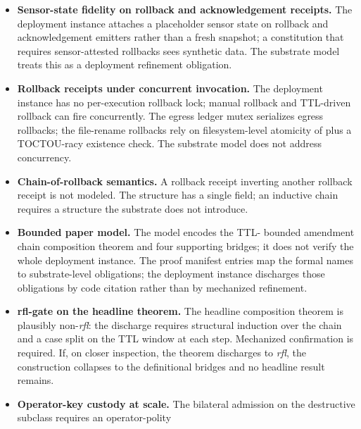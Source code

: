 \begin{itemize}
    path, the tool-preflight admission hook, and the package-manager
    runtime guard. The substrate model treats sensor state as an
    audited input; the deployment instance's input fidelity on the
    Endpoint Security path is below the substrate model's assumption.
  \item \textbf{Sensor-state fidelity on rollback and acknowledgement
    receipts.} The deployment instance attaches a placeholder sensor
    state on rollback and acknowledgement emitters rather than a
    fresh snapshot; a constitution that requires sensor-attested
    rollbacks sees synthetic data. The substrate model treats this
    as a deployment refinement obligation.
  \item \textbf{Rollback receipts under concurrent invocation.} The
    deployment instance has no per-execution rollback lock; manual
    rollback and TTL-driven rollback can fire concurrently. The
    egress ledger mutex serializes egress rollbacks; the file-rename
    rollbacks rely on filesystem-level atomicity of
     plus a TOCTOU-racy existence check. The
    substrate model does not address concurrency.
  \item \textbf{Chain-of-rollback semantics.} A rollback receipt
    inverting another rollback receipt is not modeled. The
     structure has a single
     field; an inductive chain requires a
    structure the substrate does not introduce.
  \item \textbf{Bounded paper model.} The model encodes the TTL-
    bounded amendment chain composition theorem and four supporting
    bridges; it does not verify the whole deployment instance. The
    proof manifest entries map the formal names to substrate-level
    obligations; the deployment instance discharges those obligations
    by code citation rather than by mechanized refinement.
  \item \textbf{rfl-gate on the headline theorem.} The headline
    composition theorem 
    is plausibly non-\emph{rfl}: the discharge requires structural
    induction over the chain and a case split on the TTL window at
    each step. Mechanized confirmation is required. If, on closer
    inspection, the theorem discharges to \emph{rfl}, the construction
    collapses to the definitional bridges and no headline result
    remains.
  \item \textbf{Operator-key custody at scale.} The bilateral
    admission on the destructive subclass requires an operator-polity

\end{itemize}
